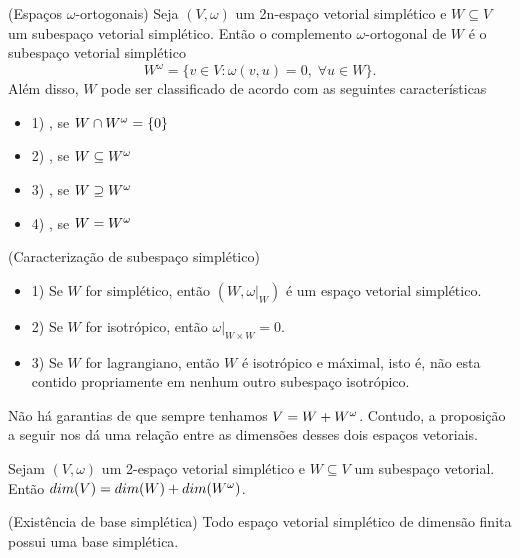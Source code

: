 \documentclass{beamer}
\begin{document}
	\begin{frame}
		\begin{definicao}
			(Espaços $\omega$-ortogonais) Seja $(V, \omega)$ um 2n-espaço vetorial simplético e $W\subseteq V$ um subespaço vetorial simplético. Então o complemento $\omega$-ortogonal de $W$ é o subespaço vetorial simplético
			$$
			W^{\omega} = \{v\in V: \omega(v,u) = 0,\;\forall u\in W \}.
			$$
			Além disso, $W$ pode ser classificado de acordo com as seguintes características
			\begin{itemize}
				\item 1) , se $W\cap W^{\omega} = \{0\}$
				
				\item 2) , se $W \subseteq W^{\omega}$
				
				\item 3) , se $W\supseteq W^{\omega}$
				
				\item 4) , se $W =W^{\omega}$
			\end{itemize}
		\end{definicao}	
		
	\end{frame}
	
	\begin{frame}
		\begin{lema}
			(Caracterização de subespaço simplético)
		\end{lema}
		\begin{itemize}
			\item 1) Se $W$ for simplético, então $(W, \omega|_{W})$ é um espaço vetorial simplético.
			
			\item 2) Se $W$ for isotrópico, então $\omega|_{W\times W} = 0$.
			
			\item 3) Se $W$ for lagrangiano, então $W$ é isotrópico e máximal, isto é, não esta contido propriamente em nenhum outro subespaço isotrópico. 
		\end{itemize}
		Não há garantias de que sempre tenhamos $V = W + W^{\omega}$. Contudo, a proposição a seguir nos dá uma relação entre as dimensões desses dois espaços vetoriais.
		
	\end{frame}
	
	\begin{frame}
		
		\begin{proposicao}
			Sejam $(V,\omega)$ um 2-espaço vetorial simplético e $W \subseteq V$ um subespaço vetorial. Então $dim(V) = dim(W) + dim(W^{\omega})$.
		\end{proposicao}
		
		\pause
		\begin{teorema}
			(Existência de base simplética) Todo espaço vetorial simplético de dimensão finita possui uma base simplética.
		\end{teorema}
	\end{frame}
	
\end{document}
